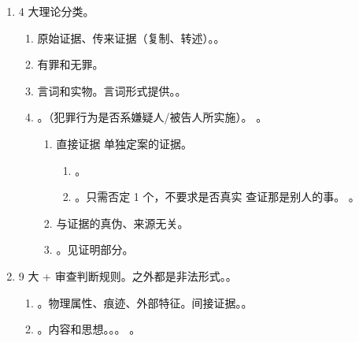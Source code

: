 \begin{enumerate}
\begin{enumerate}
\begin{enumerate}
                  \item 要满足证明的标准。
                \end{enumerate}
          \item 自由心证。同民诉。
          \item 直接言词。亲自面对，口头陈述。
        \end{enumerate}
  \item 4 大理论分类。
        \begin{enumerate}
          \item 原始证据、传来证据（复制、转述）。。
          \item 有罪和无罪。
          \item 言词和实物。言词形式提供。。
          \item {}。（犯罪行为是否系嫌疑人/被告人所实施）。
                。
                \begin{enumerate}
                  \item 直接证据 \bdy 单独定案的证据。
                        \begin{enumerate}
                          \item {}。
                          \item {}。只需否定 1 个，不要求是否真实 \yjt 查证那是别人的事。
                                。
                        \end{enumerate}
                  \item 与证据的真伪、来源无关。
                  \item {}。见证明部分。
                \end{enumerate}
        \end{enumerate}
  \item 9 大 + 审查判断规则。之外都是非法形式。。
        \begin{enumerate}
          \item {}。物理属性、痕迹、外部特征。间接证据。。
          \item {}。内容和思想。。\sjt {}。
                。

\end{enumerate}
\end{enumerate}
